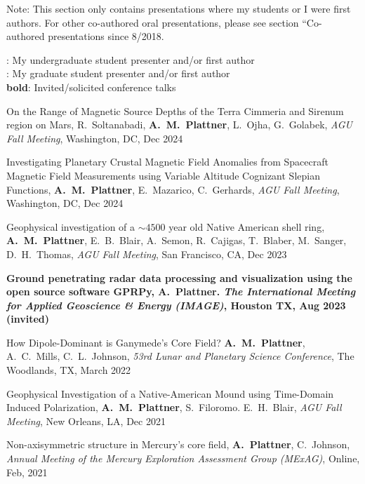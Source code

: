 \documentclass[10pt]{article}
\begin{document}
\vspace{0.2cm}
Note: This section only contains presentations where my students or I were first authors. For other co-authored oral presentations, please see section ``Co-authored presentations since 8/2018.

\spcp
\ug: My undergraduate student presenter and/or first author\\
\gr: My graduate student presenter and/or first author\\
\textbf{bold}: Invited/solicited conference talks

\spcp
\hspace{-0.4cm} \gr \hspace{-0.03cm} On the Range of Magnetic Source Depths of the Terra Cimmeria
and Sirenum region on Mars, R.\ Soltanabadi, \textbf{A.~M.~Plattner},
L.\ Ojha, G.\ Golabek,  \emph{AGU Fall Meeting}, Washington, DC, Dec 2024

\spcp
Investigating Planetary Crustal Magnetic Field Anomalies from
Spacecraft Magnetic Field Measurements using Variable Altitude
Cognizant Slepian Functions, \textbf{A.~M.~Plattner}, E.\ Mazarico,
C.\ Gerhards, \emph{AGU Fall Meeting}, Washington, DC, Dec 2024

\spcp
Geophysical investigation of a $\sim4500$ year old Native American shell ring, \textbf{A.~M.~Plattner}, E.~B.~Blair, A.~Semon, R.~Cajigas, T.~Blaber, M.~Sanger, D.~H.~Thomas,  \emph{AGU Fall Meeting}, San Francisco, CA, Dec 2023

\spcp
\textbf{Ground penetrating radar data processing and visualization using the open source software GPRPy, A.~Plattner. \emph{The International Meeting for
Applied Geoscience \& Energy (IMAGE)}, Houston TX, Aug 2023 (invited)}

\spcp
\hspace{-0.4cm} \gr \hspace{-0.03cm} How Dipole-Dominant is Ganymede’s Core Field? \textbf{A.~M.~Plattner}, A.~C.~Mills, C.~L.~Johnson, \emph{53rd Lunar and Planetary Science Conference},
The Woodlands, TX, March 2022


\spcp
Geophysical Investigation of a Native-American Mound using Time-Domain Induced Polarization, \textbf{A.~M.~Plattner}, S.~Filoromo. E.~H.~Blair, \emph{AGU Fall Meeting}, New Orleans, LA, Dec 2021


\spcp
Non-axisymmetric structure in Mercury's core field, \textbf{A.~Plattner}, C.~Johnson, \emph{Annual Meeting of the Mercury Exploration Assessment Group (MExAG)}, Online, Feb, 2021
\end{document}
